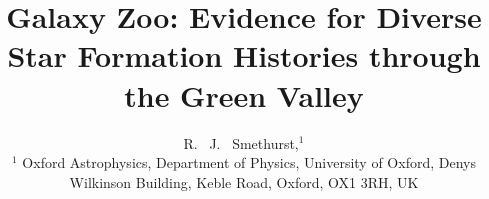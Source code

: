 \documentclass{mn2e}
\begin{document}
\title[The Star Formation History of the Green Valley]{Galaxy Zoo: Evidence for Diverse Star Formation Histories through the Green Valley}
\author[Smethurst et al. 2014]{R. ~J. ~Smethurst,$^1$
\\ $^1$ Oxford Astrophysics, Department of Physics, University of Oxford, Denys Wilkinson Building, Keble Road, Oxford, OX1 3RH, UK }

\maketitle

\begin{abstract}

\end{abstract}
\end{document}
